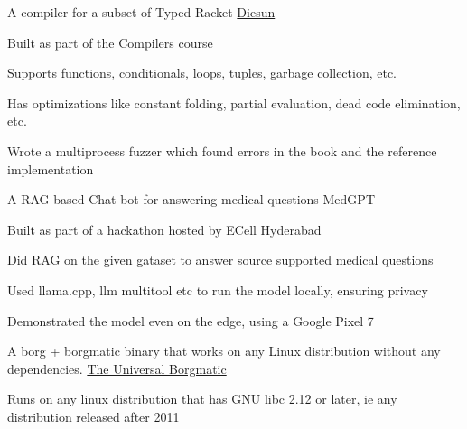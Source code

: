 
\begin{cventries}
    
    
    \cventry
    {A compiler for a subset of Typed Racket} %
    {\href{https://github.com/necessary129/diesun}{Diesun}} %
    {} %
    {} %
    {
      \begin{cvitems} %
        \item {Built as part of the Compilers course}
        \item {Supports functions, conditionals, loops, tuples, garbage collection, etc.}
        \item {Has optimizations like constant folding, partial evaluation, dead code elimination, etc.}
        \item {Wrote a multiprocess fuzzer which found errors in the book and the reference implementation}
      \end{cvitems}
    }
    
    
    \cventry
    {A RAG based Chat bot for answering medical questions} %
    {MedGPT} %
    {} %
    {} %
    {
      \begin{cvitems} %
        \item {Built as part of a hackathon hosted by ECell Hyderabad}
        \item {Did RAG on the given gataset to answer source supported medical questions}
        \item {Used llama.cpp, llm multitool etc to run the model locally, ensuring privacy}
        \item {Demonstrated the model even on the edge, using a Google Pixel 7}
      \end{cvitems}
    }
    
    
    \cventry
    {A borg + borgmatic binary that works on any Linux distribution without any dependencies.} %
    {\href{https://github.com/necessary129/the-universal-borgmatic}{The Universal Borgmatic}} %
    {} %
    {} %
    {
      \begin{cvitems} %
        \item {Runs on any linux distribution that has GNU libc 2.12 or later, ie any distribution released after 2011}
      \end{cvitems}
    }
    

\end{cventries}
